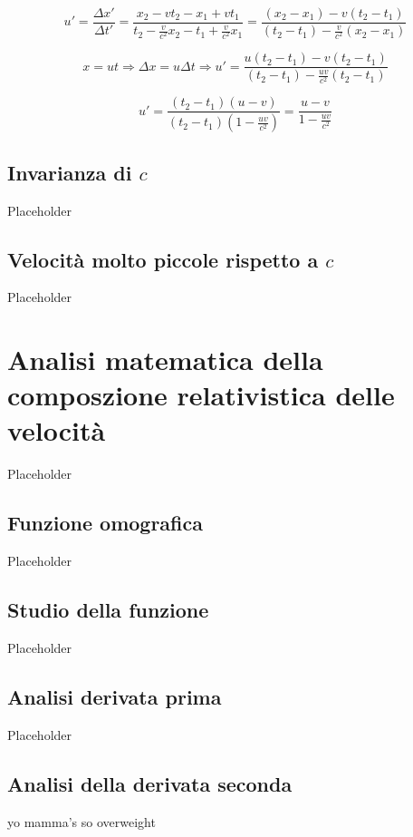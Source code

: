 \documentclass{article}
\begin{document}
\begin{equation}
    u' = \frac{\Delta x'}{\Delta t'} = \frac{x_2 - vt_2 - x_1 + vt_1}{t_2 - \frac{v}{c^2} x_2 - t_1 + \frac{v}{c^2} x_1} = \frac{(x_2 - x_1) - v(t_2 - t_1)}{(t_2 - t_1) - \frac{v}{c^2}(x_2 - x_1)}{}
\end{equation}

\begin{equation}
    x = ut \Rightarrow \Delta x = u \Delta t \Rightarrow u' = \frac{u(t_2 - t_1) - v(t_2 - t_1)}{(t_2 - t_1)-\frac{uv}{c^2}(t_2 - t_1)}
\end{equation}

\begin{equation}
    u' = \frac{(t_2 - t_1)(u - v)}{(t_2 - t_1)\left(1 - \frac{uv}{c^2}\right)} = \frac{u - v}{1 - \frac{uv}{c^2}}
\end{equation}


\subsection{Invarianza di \(c\)}
Placeholder

\subsection{Velocità molto piccole rispetto a \(c\)}
Placeholder

\section{Analisi matematica della composzione relativistica delle velocità}
Placeholder


\subsection{Funzione omografica}
Placeholder

\subsection{Studio della funzione}
Placeholder

\subsection{Analisi derivata prima}
Placeholder

\subsection{Analisi della derivata seconda}
yo mamma's so overweight
\end{document}
